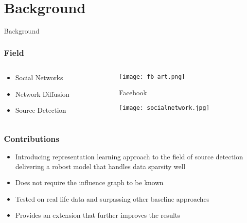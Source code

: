 \section{Background}

\begin{frame}
        \centering
        \huge Background
\end{frame}

\begin{frame}
	\frametitle{Field}
	\begin{columns}
		\begin{column}{0.4\textwidth}
			\begin{itemize}
				\item Social Networks
				\item Network Diffusion
				\item Source Detection
			\end{itemize}
		\end{column}
		\begin{column}{0.6\textwidth}
			\begin{figure}
				\centering
				\texttt{[image: fb-art.png]}
				\caption{Facebook}
			\end{figure}
			\begin{figure}
				\centering
				\texttt{[image: socialnetwork.jpg]}
			\end{figure}
		\end{column}
	\end{columns}
\end{frame}

\begin{frame}
	\frametitle{Contributions}
	\begin{itemize}
		\item Introducing representation learning approach to the field of source detection delivering a robost model that handles data sparsity well
		\item Does not require the influence graph to be known
		\item Tested on real life data and surpassing other baseline approaches
		\item Provides an extension that further improves the results
	\end{itemize}
\end{frame}